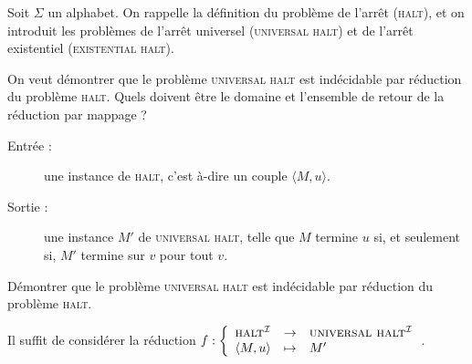 












\begin{exercice}

  Soit $\Sigma$ un alphabet. On rappelle la définition du problème de l'arrêt (\textsc{halt}),
  et on introduit les problèmes de l'arrêt universel (\textsc{universal halt})  et de
  l'arrêt existentiel (\textsc{existential halt}).



  
  \begin{questions}
  \item On veut démontrer que le problème \textsc{universal halt} est indécidable par réduction du problème \textsc{halt}.
    Quels doivent être le domaine et l'ensemble de retour de la réduction par mappage ? 
  \end{questions}
  \begin{corrections}
    \begin{description}
    \item[Entrée :] une instance de \textsc{halt}, c'est à-dire un couple $\langle M, u \rangle$.
    \item[Sortie :] une instance $M'$ de \textsc{universal halt}, telle que $M$ termine $u$ si,
      et seulement si, $M'$ termine sur $v$ pour tout $v$. 
    \end{description}
  \end{corrections}

  \begin{questions}
  \item Démontrer que le problème \textsc{universal halt} est indécidable par réduction du problème \textsc{halt}.
  \end{questions}
  \begin{corrections}
    Il suffit de considérer la réduction
    $f : \left\{\begin{array}{rcll}
    \textsc{halt}^{\mathcal{I}} &\rightarrow& \textsc{universal halt}^{\mathcal{I}}\\
    \langle M, u \rangle & \mapsto& M'
    \end{array}\right.$.
    

\end{corrections}
\end{exercice}
